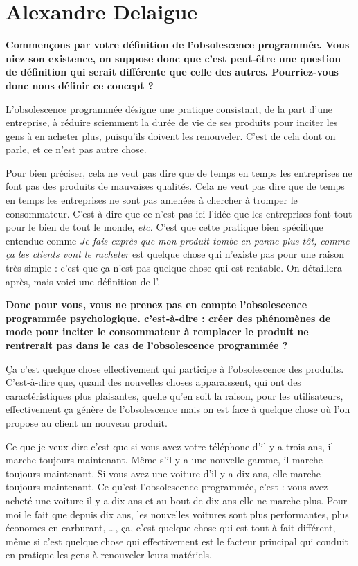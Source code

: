 \section{Alexandre Delaigue}
\label{InterviewADelaigue}

\vspace{2\baselineskip}

\begin{small}
\smallbreak\textbf{Commençons par votre définition de l'obsolescence programmée. Vous niez son existence, on suppose donc que c'est peut-être une question de définition qui serait différente que celle des autres.  Pourriez-vous donc nous définir ce concept ?
}\smallbreak

L'obsolescence programmée désigne une pratique consistant, de la part d'une entreprise, à réduire sciemment la durée de vie de ses produits pour inciter les gens à en acheter plus, puisqu'ils doivent les renouveler. C'est de cela dont on parle, et ce n'est pas autre chose. 

Pour bien préciser, cela ne veut pas dire que de temps en temps les entreprises ne font pas des produits de mauvaises qualités. Cela ne veut pas dire que de temps en temps les entreprises ne sont pas amenées à chercher à tromper le consommateur. C'est-à-dire que ce n'est pas ici l'idée que les entreprises font tout pour le bien de tout le monde, \textit{etc.} C'est que cette pratique bien spécifique entendue comme \og \textit{Je fais exprès que mon produit tombe en panne plus tôt, comme ça les clients  vont le racheter }\fg{}   est quelque chose qui n'existe pas pour une raison très simple : c'est que ça n'est pas quelque chose qui est rentable. On détaillera après,  mais voici une définition de l'\op.

\textbf{
Donc pour vous, vous ne prenez pas en compte l'obsolescence programmée psychologique. c'est-à-dire  : créer des phénomènes de mode pour inciter le consommateur à remplacer le produit ne rentrerait pas dans le cas de l'obsolescence programmée ? 
}\smallbreak

Ça c'est quelque chose effectivement qui participe à l'obsolescence des produits. C'est-à-dire que, quand des nouvelles choses apparaissent, qui ont des caractéristiques plus plaisantes, quelle qu'en soit la raison, pour les utilisateurs, effectivement ça génère de l'obsolescence mais on est face à quelque chose où l'on propose au client un nouveau produit. 

Ce que je veux dire c'est que si vous avez votre téléphone d'il y a trois ans, il marche toujours maintenant.  Même s'il y a une nouvelle gamme, il marche toujours maintenant. Si vous avez une voiture d'il y a dix ans, elle marche toujours maintenant. Ce qu'est l'obsolescence programmée, c'est : vous avez acheté une voiture il y a dix ans et au bout de dix ans elle ne marche plus. Pour moi le fait que depuis dix ans, les nouvelles voitures sont plus performantes, plus économes en carburant, \dots, ça, c'est quelque chose qui est tout à fait différent, même si c'est quelque chose qui effectivement est le facteur principal qui conduit en pratique les gens à renouveler leurs matériels.


\end{small}
